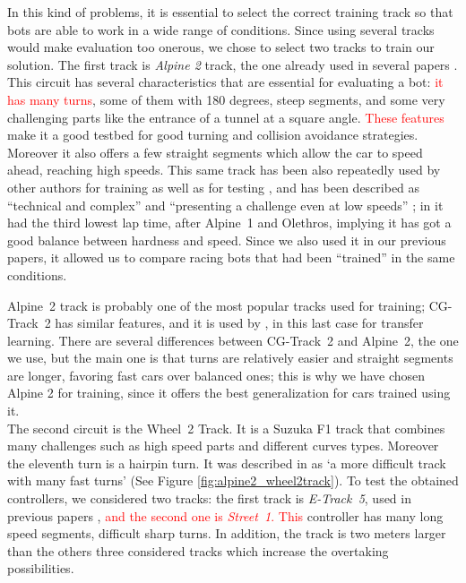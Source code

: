 \documentclass[10pt,journal,compsoc]{IEEEtran}
\begin{document}
In this kind of problems, it is essential to select the correct
training track so that bots are able to work in a wide range of
conditions. Since using several tracks would make evaluation too onerous, we chose to select two tracks to train our solution. The first track is \textit{Alpine 2} track, the one already used in several papers  \cite{salem_cig2018,DBLP:conf/cig/SalemMG19}. This circuit has several characteristics that
are essential for evaluating a bot: \textcolor{red}{it has many turns}, some of
them with 180 degrees, steep segments, and some very challenging parts
like the entrance of a tunnel at a square angle.\textcolor{red}{ These features} make
it a good testbed for good turning and collision avoidance
strategies. Moreover it also offers a few straight segments which allow the car to speed ahead, reaching high speeds. This same track has been also repeatedly used by other authors for training as well as for testing \cite{cardamone2010applying}, and has been described as ``technical and complex'' \cite{AG} and ``presenting a challenge even at low speeds'' \cite{vrajitoru2018global}; in \cite{AG} it had the third lowest lap time, after \mbox{Alpine 1} and Olethros, implying it has got a good balance between hardness and speed. Since we also used it in our previous papers, it allowed us to compare racing bots that had been ``trained'' in the same conditions.

\mbox{Alpine 2} track is probably one of the most popular tracks used for
training; \mbox{CG-Track 2} has similar features, and it is used by
\cite{mirus2019short,8833873,verma2018programmatically},
in this last case for transfer learning. There are several differences between \mbox{CG-Track 2} and \mbox{Alpine 2}, the one we use, but the main one is that turns are relatively easier and straight segments are longer, favoring fast cars over balanced ones; this is why we have chosen Alpine 2 for training, since
it offers the best generalization for cars trained using it.\\
The second circuit is the \mbox{Wheel 2} Track. It is a  Suzuka F1 track that combines many challenges such as high speed parts and different curves types. Moreover the eleventh turn is a hairpin turn. It was  described in \cite{wheel2track_chen} as `a more difficult track with many fast turns' (See Figure \ref{fig:alpine2_wheel2track}).
To test the obtained controllers, we considered two tracks: the first track is \mbox{\textit{E-Track 5}}, used in previous papers \cite{salem_evo17},\cite{salem_evo18} \textcolor{red}{and the second one is \mbox{\textit{Street 1}}.
This }controller has many long speed segments, difficult sharp turns. In addition, the track is two meters larger than the others  three considered tracks which increase the overtaking possibilities.
\end{document}
